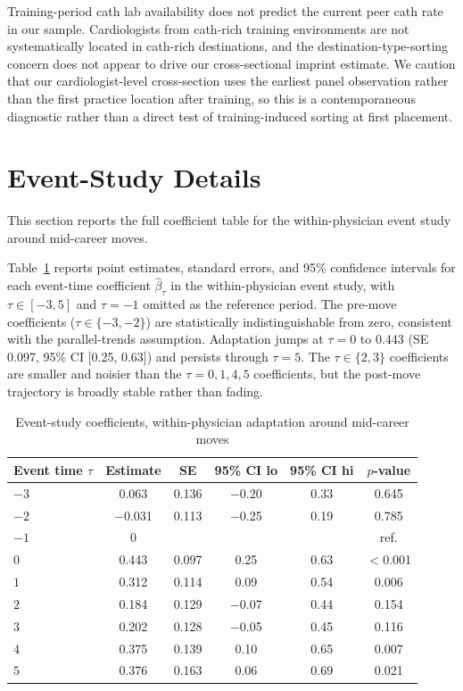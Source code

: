 \documentclass[12pt]{article}
\begin{document}
Training-period cath lab availability does not predict the current peer cath rate in our sample. Cardiologists from cath-rich training environments are not systematically located in cath-rich destinations, and the destination-type-sorting concern does not appear to drive our cross-sectional imprint estimate. We caution that our cardiologist-level cross-section uses the earliest panel observation rather than the first practice location after training, so this is a contemporaneous diagnostic rather than a direct test of training-induced sorting at first placement.

\section{Event-Study Details}\label{sec:app-es}

This section reports the full coefficient table for the within-physician event study around mid-career moves.

Table~\ref{tab:app-es-coefs} reports point estimates, standard errors, and 95\% confidence intervals for each event-time coefficient $\hat\beta_\tau$ in the within-physician event study, with $\tau \in [-3, 5]$ and $\tau = -1$ omitted as the reference period. The pre-move coefficients ($\tau \in \{-3, -2\}$) are statistically indistinguishable from zero, consistent with the parallel-trends assumption. Adaptation jumps at $\tau = 0$ to 0.443 (SE 0.097, 95\% CI [0.25, 0.63]) and persists through $\tau = 5$. The $\tau \in \{2, 3\}$ coefficients are smaller and noisier than the $\tau = 0, 1, 4, 5$ coefficients, but the post-move trajectory is broadly stable rather than fading.

\begin{table}[htbp]
\centering
\begin{minipage}[h]{0.85\textwidth}
  \caption{Event-study coefficients, within-physician adaptation around mid-career moves}
  \label{tab:app-es-coefs}
  \centering
  \begin{tabular}{lccccc}
  \toprule
  Event time $\tau$ & Estimate & SE & 95\% CI lo & 95\% CI hi & $p$-value \\
  \midrule
  $-3$ & 0.063  & 0.136 & $-$0.20 & 0.33 & 0.645 \\
  $-2$ & $-$0.031 & 0.113 & $-$0.25 & 0.19 & 0.785 \\
  $-1$ & 0       &       &         &      & ref.  \\
  $0$  & 0.443  & 0.097 & 0.25    & 0.63 & $<$0.001 \\
  $1$  & 0.312  & 0.114 & 0.09    & 0.54 & 0.006 \\
  $2$  & 0.184  & 0.129 & $-$0.07 & 0.44 & 0.154 \\
  $3$  & 0.202  & 0.128 & $-$0.05 & 0.45 & 0.116 \\
  $4$  & 0.375  & 0.139 & 0.10    & 0.65 & 0.007 \\
  $5$  & 0.376  & 0.163 & 0.06    & 0.69 & 0.021 \\
  \bottomrule
  \end{tabular}
\end{minipage}
\end{table}
\end{document}
